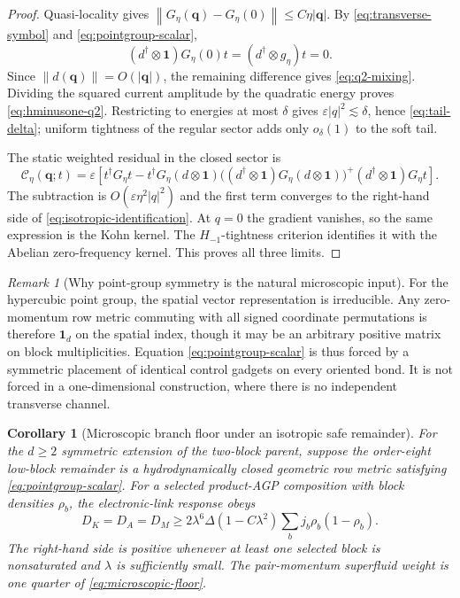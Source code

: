 \documentclass[11pt]{article}
\newtheorem{corollary}[theorem]{Corollary}
\theoremstyle{definition}
\theoremstyle{remark}
\newtheorem{remark}[theorem]{Remark}
\newcommand{\cC}{\mathcal C}
\newcommand{\Id}{\mathbf 1}
\newcommand{\norm}[1]{\left\lVert #1\right\rVert}
\newcommand{\abs}[1]{\left\lvert #1\right\rvert}
\newcommand{\eps}{\varepsilon}
\newcommand{\bq}{\bm q}
\begin{document}
\begin{proof}
Quasi-locality gives
$\norm{G_\eta(\bq)-G_\eta(0)}\le C\eta\abs{\bq}$.  By
\eqref{eq:transverse-symbol} and \eqref{eq:pointgroup-scalar},
\begin{equation}
 (d^\dagger\otimes\Id)G_\eta(0)t
 =(d^\dagger\otimes g_\eta)t=0.
\end{equation}
Since $\norm{d(\bq)}=O(\abs\bq)$, the remaining difference gives
\eqref{eq:q2-mixing}.  Dividing the squared current amplitude by the
quadratic energy proves \eqref{eq:hminusone-q2}.  Restricting to energies at
most $\delta$ gives $\eps\abs q^2\lesssim\delta$, hence
\eqref{eq:tail-delta}; uniform tightness of the regular sector adds only
$o_\delta(1)$ to the soft tail.

The static weighted residual in the closed sector is
\begin{equation}
 \cC_\eta(\bq;t)
 =\eps\left[
 t^\dagger G_\eta t
 -t^\dagger G_\eta(d\otimes\Id)
 \bigl((d^\dagger\otimes\Id)G_\eta(d\otimes\Id)\bigr)^+
 (d^\dagger\otimes\Id)G_\eta t
 \right].
 \label{eq:symbol-residual}
\end{equation}
The subtraction is $O(\eps\eta^2\abs q^2)$ and the first term converges to
the right-hand side of \eqref{eq:isotropic-identification}.  At $q=0$ the
gradient vanishes, so the same expression is the Kohn kernel.  The
$H_{-1}$-tightness criterion identifies it with the Abelian zero-frequency
kernel.  This proves all three limits.
\end{proof}

\begin{remark}[Why point-group symmetry is the natural microscopic input]
For the hypercubic point group, the spatial vector representation is
irreducible.  Any zero-momentum row metric commuting with all signed coordinate
permutations is therefore $\Id_d$ on the spatial index, though it may be an
arbitrary positive matrix on block multiplicities.  Equation
\eqref{eq:pointgroup-scalar} is thus forced by a symmetric placement of
identical control gadgets on every oriented bond.  It is not forced in a
one-dimensional construction, where there is no independent transverse
channel.
\end{remark}

\begin{corollary}[Microscopic branch floor under an isotropic safe remainder]
\label{cor:micro-floor}
For the $d\ge2$ symmetric extension of the two-block parent, suppose the
order-eight low-block remainder is a hydrodynamically closed geometric row
metric satisfying \eqref{eq:pointgroup-scalar}.  For a selected product-AGP
composition with block densities $\rho_b$, the electronic-link response obeys
\begin{equation}
 D_K=D_A=D_M
 \ge2\lambda^6\Delta
 \left(1-C\lambda^2\right)
 \sum_bj_b\rho_b(1-\rho_b).
 \label{eq:microscopic-floor}
\end{equation}
The right-hand side is positive whenever at least one selected block is
nonsaturated and $\lambda$ is sufficiently small.  The pair-momentum
superfluid weight is one quarter of \eqref{eq:microscopic-floor}.
\end{corollary}
\end{document}
